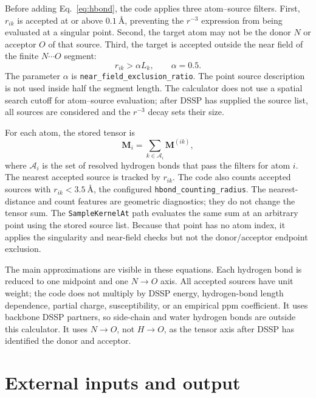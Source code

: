 \documentclass[11pt]{article}
\begin{document}
Before adding Eq.~\eqref{eq:hbond}, the code applies three atom--source
filters. First, \(r_{ik}\) is accepted at or above \(\SI{0.1}{\angstrom}\),
preventing the \(r^{-3}\) expression from being evaluated at a singular point.
Second, the target atom may not be the donor \(N\) or acceptor \(O\) of that
source. Third, the target is accepted outside the near field of the finite
\(N\cdots O\) segment:
\begin{equation}
  r_{ik} > \alpha L_k,\qquad \alpha=0.5 .
  \label{eq:nearfield}
\end{equation}
The parameter \(\alpha\) is \texttt{near\_field\_exclusion\_ratio}. The point
source description is not used inside half the segment length. The calculator
does not use a spatial search cutoff for atom--source evaluation; after DSSP
has supplied the source list, all sources are considered and the \(r^{-3}\)
decay sets their size.

For each atom, the stored tensor is
\begin{equation}
  \bm M_i = \sum_{k\in \mathcal A_i}\bm M^{(ik)},
  \label{eq:sum}
\end{equation}
where \(\mathcal A_i\) is the set of resolved hydrogen bonds that pass the
filters for atom \(i\). The nearest accepted source is tracked by \(r_{ik}\).
The code also counts accepted sources with \(r_{ik}<\SI{3.5}{\angstrom}\), the
configured \texttt{hbond\_counting\_radius}. The nearest-distance and count
features are geometric diagnostics; they do not change the tensor sum.
The \texttt{SampleKernelAt} path evaluates the same sum at an arbitrary point
using the stored source list. Because that point has no atom index, it applies
the singularity and near-field checks but not the donor/acceptor endpoint
exclusion.

The main approximations are visible in these equations. Each hydrogen bond is
reduced to one midpoint and one \(N\to O\) axis. All accepted sources have unit
weight; the code does not multiply by DSSP energy, hydrogen-bond length
dependence, partial charge, susceptibility, or an empirical ppm coefficient. It
uses backbone DSSP partners, so side-chain and water hydrogen bonds are outside
this calculator. It uses \(N\to O\), not \(H\to O\), as the tensor axis after
DSSP has identified the donor and acceptor.

\section{External inputs and output}
\end{document}
